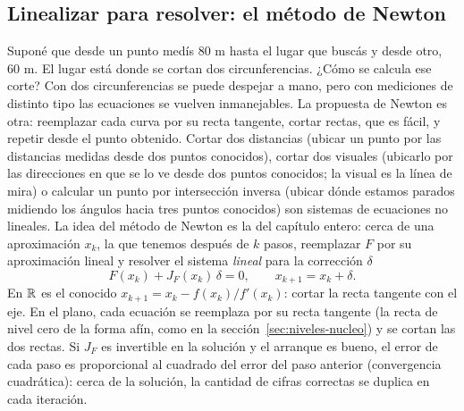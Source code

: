 \subsection{Linealizar para resolver: el método de Newton}\label{sec:newton}

Suponé que desde un punto medís \(80\) m hasta el lugar que buscás y desde otro, \(60\) m. El
lugar está donde se cortan dos circunferencias. ¿Cómo se calcula ese corte? Con dos
circunferencias se puede despejar a mano, pero con mediciones de distinto tipo las ecuaciones
se vuelven inmanejables. La propuesta de Newton es otra: reemplazar cada curva por su recta
tangente, cortar rectas, que es fácil, y repetir desde el punto obtenido. Cortar dos distancias
(ubicar un punto por las distancias medidas desde dos puntos conocidos), cortar dos visuales
(ubicarlo por las direcciones en que se lo ve desde dos puntos conocidos; la visual es la línea
de mira) o calcular un punto por intersección inversa (ubicar dónde estamos parados midiendo
los ángulos hacia tres puntos conocidos) son
sistemas de ecuaciones no lineales. La idea del método de Newton es la del capítulo entero:
cerca de una aproximación \(x_k\), la que tenemos después de \(k\) pasos, reemplazar \(F\) por su
aproximación lineal y resolver el sistema \emph{lineal} para la corrección \(\delta\)
\[
  F(x_k)+J_F(x_k)\,\delta=0,\qquad x_{k+1}=x_k+\delta .
\]
En \(\mathbb{R}\) es el conocido \(x_{k+1}=x_k-f(x_k)/f'(x_k)\): cortar la recta tangente con el eje.
En el plano, cada ecuación se reemplaza por su recta tangente (la recta de nivel cero de la
forma afín, como en la sección~\ref{sec:niveles-nucleo}) y se cortan las dos rectas. Si
\(J_F\) es invertible en la solución y el arranque es bueno, el error de cada paso es
proporcional al cuadrado del error del paso anterior (convergencia cuadrática): cerca de la
solución, la cantidad de cifras correctas se duplica en cada iteración.

